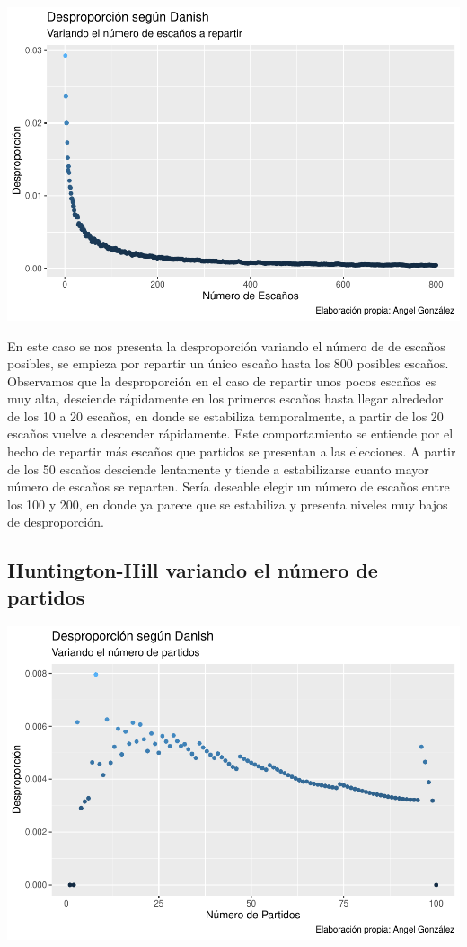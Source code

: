 \documentclass[12pt,a4paper,]{book}
\numberwithin{dummy}{section}
\theoremstyle{ocrenumbox}
\theoremstyle{blacknumex}
\theoremstyle{blacknumbox}
\theoremstyle{ocrenum}
\theoremstyle{ocrenum}
\begin{document}
\begin{center}\includegraphics[width=0.95\linewidth]{figurasR/unnamed-chunk-36-1} \end{center}

En este caso se nos presenta la desproporción variando el número de de
escaños posibles, se empieza por repartir un único escaño hasta los 800
posibles escaños. Observamos que la desproporción en el caso de repartir
unos pocos escaños es muy alta, desciende rápidamente en los primeros
escaños hasta llegar alrededor de los 10 a 20 escaños, en donde se
estabiliza temporalmente, a partir de los 20 escaños vuelve a descender
rápidamente. Este comportamiento se entiende por el hecho de repartir
más escaños que partidos se presentan a las elecciones. A partir de los
50 escaños desciende lentamente y tiende a estabilizarse cuanto mayor
número de escaños se reparten. Sería deseable elegir un número de
escaños entre los 100 y 200, en donde ya parece que se estabiliza y
presenta niveles muy bajos de desproporción.

\hypertarget{huntington-hill-variando-el-nuxfamero-de-partidos}{%
\subsection{Huntington-Hill variando el número de
partidos}\label{huntington-hill-variando-el-nuxfamero-de-partidos}}

\begin{center}\includegraphics[width=0.95\linewidth]{figurasR/unnamed-chunk-37-1} \end{center}
\end{document}
